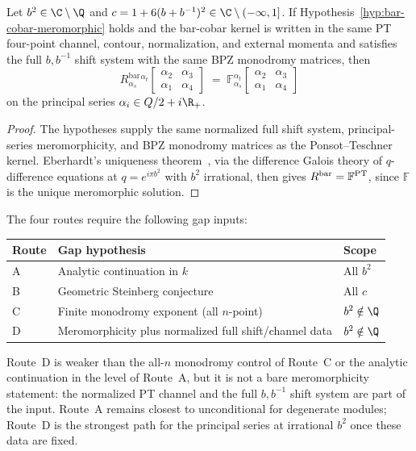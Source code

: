 \begin{theorem}
\label{thm:shift-equation-identification}
Let\/ $b^2 \in \C \setminus \Q$ and\/
$c = 1 + 6(b + b^{-1})^2 \in \C \setminus (-\infty, 1]$.
If Hypothesis~\textup{\ref{hyp:bar-cobar-meromorphic}} holds and the
bar-cobar kernel is written in the same PT four-point channel, contour,
normalization, and external momenta and satisfies the full
$b,b^{-1}$ shift system with the same BPZ monodromy matrices, then
\[
R^{\mathrm{bar}}_{\alpha_s}{}^{\alpha_t}
\!\left[\begin{smallmatrix}
\alpha_2 & \alpha_3 \\
\alpha_1 & \alpha_4
\end{smallmatrix}\right]
\;=\;
\mathbb{F}_{\alpha_s}^{\alpha_t}
\!\left[\begin{smallmatrix}
\alpha_2 & \alpha_3 \\
\alpha_1 & \alpha_4
\end{smallmatrix}\right]
\]
on the principal series $\alpha_i \in Q/2 + i\R_+$.
\end{theorem}

\begin{proof}
The hypotheses supply the same normalized full shift system,
principal-series meromorphicity, and BPZ monodromy matrices as the
Ponsot--Teschner kernel. Eberhardt's uniqueness
theorem~\cite[Theorem~1.1]{Eberhardt23}, via the difference Galois
theory of $q$-difference equations at $q = e^{i\pi b^2}$ with
$b^2$ irrational, then gives
$R^{\mathrm{bar}} = \mathbb{F}^{\mathrm{PT}}$, since $\mathbb{F}$ is
the unique meromorphic solution.
\end{proof}

\begin{remark}
\label{rem:route-D-comparison}
The four routes require the following gap inputs:
\begin{center}
\begin{tabular}{lll}
Route & Gap hypothesis & Scope \\
\hline
A & Analytic continuation in $k$ & All $b^2$ \\
B & Geometric Steinberg conjecture & All $c$ \\
C & Finite monodromy exponent (all $n$-point) & $b^2 \notin \Q$ \\
D & Meromorphicity plus normalized full shift/channel data & $b^2 \notin \Q$ \\
\end{tabular}
\end{center}
Route~D is weaker than the all-$n$ monodromy control of Route~C or the
analytic continuation in the level of Route~A, but it is not a bare
meromorphicity statement: the normalized PT channel and the full
$b,b^{-1}$ shift system are part of the input. Route~A remains closest
to unconditional for degenerate modules; Route~D is the strongest path
for the principal series at irrational $b^2$ once these data are fixed.
\end{remark}

